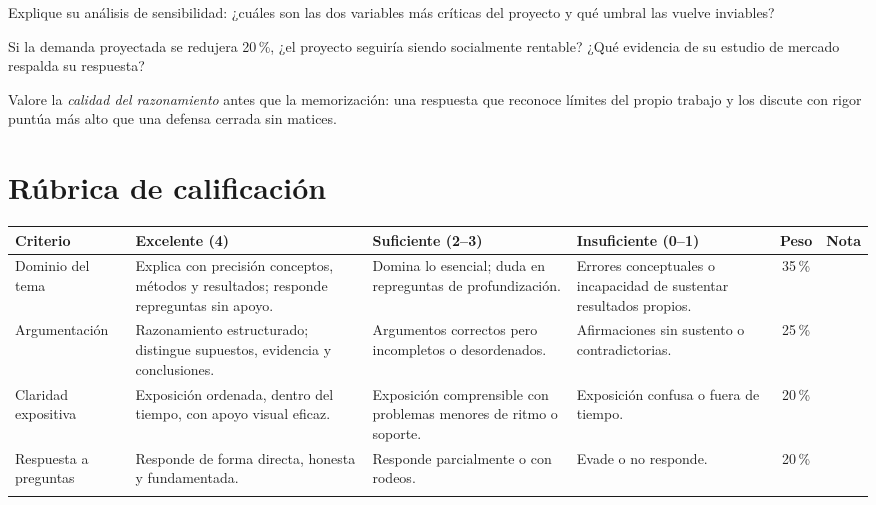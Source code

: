 \documentclass{evaluacion}
\begin{document}
\begin{pregunta}
Explique su análisis de sensibilidad: ¿cuáles son las dos variables más
críticas del proyecto y qué umbral las vuelve inviables?
\end{pregunta}

\begin{pregunta}
Si la demanda proyectada se redujera 20\,\%, ¿el proyecto seguiría siendo
socialmente rentable? ¿Qué evidencia de su estudio de mercado respalda su
respuesta?
\end{pregunta}

\begin{observacion}
Valore la \emph{calidad del razonamiento} antes que la memorización:
una respuesta que reconoce límites del propio trabajo y los discute con
rigor puntúa más alto que una defensa cerrada sin matices.
\end{observacion}

\section*{\color{colorprimario}Rúbrica de calificación}

{\small
\renewcommand{\arraystretch}{1.45}
\begin{tabularx}{\textwidth}{@{}p{2.6cm} X X X c c@{}}
  \textbf{Criterio} & \textbf{Excelente (4)} & \textbf{Suficiente (2--3)}
    & \textbf{Insuficiente (0--1)} & \textbf{Peso} & \textbf{Nota}\\
  \hline\addlinespace[4pt]
  Dominio del tema &
    Explica con precisión conceptos, métodos y resultados; responde
    repreguntas sin apoyo. &
    Domina lo esencial; duda en repreguntas de profundización. &
    Errores conceptuales o incapacidad de sustentar resultados propios.
    & 35\,\% & \\
  \addlinespace[4pt]
  Argumentación &
    Razonamiento estructurado; distingue supuestos, evidencia y
    conclusiones. &
    Argumentos correctos pero incompletos o desordenados. &
    Afirmaciones sin sustento o contradictorias. & 25\,\% & \\
  \addlinespace[4pt]
  Claridad expositiva &
    Exposición ordenada, dentro del tiempo, con apoyo visual eficaz. &
    Exposición comprensible con problemas menores de ritmo o soporte. &
    Exposición confusa o fuera de tiempo. & 20\,\% & \\
  \addlinespace[4pt]
  Respuesta a preguntas &
    Responde de forma directa, honesta y fundamentada. &
    Responde parcialmente o con rodeos. &
    Evade o no responde. & 20\,\% & \\
  \addlinespace[6pt]\hline\addlinespace[6pt]
  \multicolumn{4}{r}{\textbf{Nota final (sobre 20):}} &
  \multicolumn{2}{l}{\hrulefill}\\
\end{tabularx}
}
\end{document}
